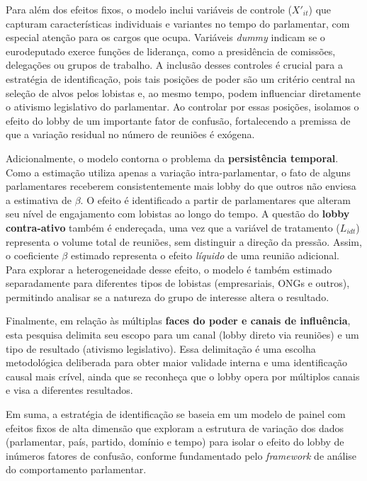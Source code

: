 Para além dos efeitos fixos, o modelo inclui variáveis de controle ($X'_{it}$) que capturam características individuais e variantes no tempo do parlamentar, com especial atenção para os cargos que ocupa. Variáveis \textit{dummy} indicam se o eurodeputado exerce funções de liderança, como a presidência de comissões, delegações ou grupos de trabalho. A inclusão desses controles é crucial para a estratégia de identificação, pois tais posições de poder são um critério central na seleção de alvos pelos lobistas e, ao mesmo tempo, podem influenciar diretamente o ativismo legislativo do parlamentar. Ao controlar por essas posições, isolamos o efeito do lobby de um importante fator de confusão, fortalecendo a premissa de que a variação residual no número de reuniões é exógena.

Adicionalmente, o modelo contorna o problema da \textbf{persistência temporal}. Como a estimação utiliza apenas a variação intra-parlamentar, o fato de alguns parlamentares receberem consistentemente mais lobby do que outros não enviesa a estimativa de $\beta$. O efeito é identificado a partir de parlamentares que alteram seu nível de engajamento com lobistas ao longo do tempo. A questão do \textbf{lobby contra-ativo} também é endereçada, uma vez que a variável de tratamento ($L_{idt}$) representa o volume total de reuniões, sem distinguir a direção da pressão. Assim, o coeficiente $\beta$ estimado representa o efeito \textit{líquido} de uma reunião adicional. Para explorar a heterogeneidade desse efeito, o modelo é também estimado separadamente para diferentes tipos de lobistas (empresariais, ONGs e outros), permitindo analisar se a natureza do grupo de interesse altera o resultado.

Finalmente, em relação às múltiplas \textbf{faces do poder e canais de influência}, esta pesquisa delimita seu escopo para um canal (lobby direto via reuniões) e um tipo de resultado (ativismo legislativo). Essa delimitação é uma escolha metodológica deliberada para obter maior validade interna e uma identificação causal mais crível, ainda que se reconheça que o lobby opera por múltiplos canais e visa a diferentes resultados.

Em suma, a estratégia de identificação se baseia em um modelo de painel com efeitos fixos de alta dimensão que exploram a estrutura de variação dos dados (parlamentar, país, partido, domínio e tempo) para isolar o efeito do lobby de inúmeros fatores de confusão, conforme fundamentado pelo \textit{framework} de análise do comportamento parlamentar.

